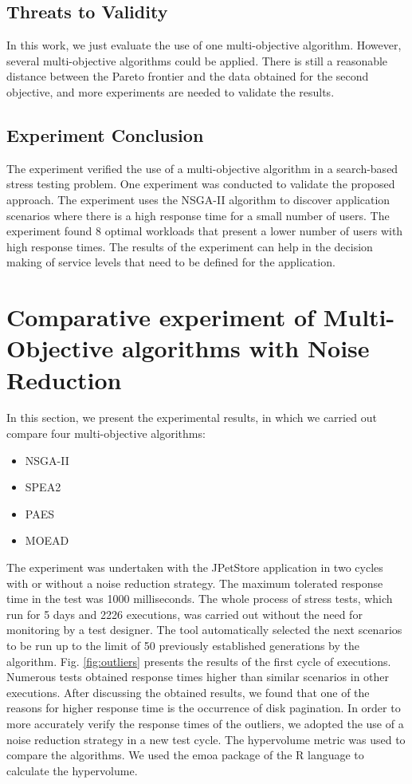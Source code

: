 \documentclass[espaco=umemeio,chapter=TITLE,twoside,openright]{abnt}
\begin{document}
\subsection{Threats to Validity}

In this work, we just evaluate the use of one multi-objective algorithm. However, several multi-objective algorithms could be applied.  There is still a reasonable distance between the Pareto frontier and the data obtained for the second objective, and more experiments are needed to validate the results.

\subsection{Experiment Conclusion}


The experiment verified the use of a multi-objective algorithm in a search-based stress testing problem. One experiment was conducted to validate the proposed approach. The experiment uses the NSGA-II algorithm to discover application scenarios where there is a high response time for a small number of users. The experiment found 8 optimal workloads that present a lower number of users with high response times. The results of the experiment can help in the decision making of service levels that need to be defined for the application.

\section{Comparative experiment of Multi-Objective algorithms with Noise Reduction}


In this section, we present the experimental results, in which we carried out compare four multi-objective algorithms:

\begin{itemize}
\item NSGA-II
\item SPEA2
\item PAES
\item MOEAD
\end{itemize}

The experiment was undertaken with the JPetStore application in two cycles with or without a noise reduction strategy. The maximum tolerated response time in the test was 1000 milliseconds.  The whole process of stress tests, which run for 5 days and 2226 executions, was carried out without the need for monitoring by a test designer. The tool automatically selected the next scenarios to be run up to the limit of 50 previously established  generations by the algorithm. Fig. \ref{fig:outliers} presents the results of the first cycle of executions. Numerous tests obtained response times higher than similar scenarios in other executions. After discussing the obtained results, we found that one of the reasons for higher response time is the occurrence of disk pagination. In order to more accurately verify the response times of the outliers, we adopted the use of a noise reduction strategy in a new test cycle. The hypervolume metric was used to compare the algorithms. We used the emoa package of the R language to calculate the hypervolume.
\end{document}
